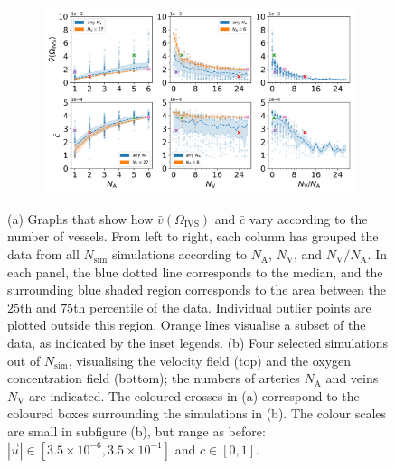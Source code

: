             \begin{figure}
                \centering
                \begin{subfigure}{\textwidth}
                    \includegraphics[width=\textwidth]{diagrams/results-variations/mega1_no-arteries_no-veins_veins-to-arteries.png}
                    \caption{}
                    \label{fig:mega-vessels1:results}
                \end{subfigure}
                \par\bigskip\bigskip
                \begin{subfigure}{\textwidth}
                    
                    \caption{}
                    \label{fig:mega-vessels1:simulations}
                \end{subfigure}
                \caption{(a) Graphs that show how $\bar{v}(\Omega_\text{IVS})$ and $\bar{c}$ vary according to the number of vessels. From left to right, each column has grouped the data from all $N_\text{sim}$ simulations according to $N_\text{A}$, $N_\text{V}$, and $N_\text{V}/N_\text{A}$. In each panel, the blue dotted line corresponds to the median, and the surrounding blue shaded region corresponds to the area between the $25$th and $75$th percentile of the data. Individual outlier points are plotted outside this region. Orange lines visualise a subset of the data, as indicated by the inset legends. (b) Four selected simulations out of $N_\text{sim}$, visualising the velocity field (top) and the oxygen concentration field (bottom); the numbers of arteries $N_\text{A}$ and veins $N_\text{V}$ are indicated. The coloured crosses in (a) correspond to the coloured boxes surrounding the simulations in (b). The colour scales are small in subfigure (b), but range as before: $|\vec{u}| \in [3.5\times10^{-6}, 3.5\times10^{-1}]$ and $c \in [0, 1]$.}
                \label{fig:mega-vessels1}
            \end{figure}
        
